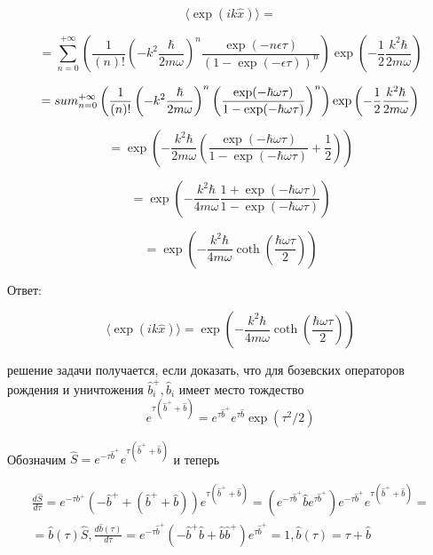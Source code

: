 \documentclass[a4paper,12pt]{article} %
\begin{document}
\begin{ttask}
$$
\langle\exp (i k \hat{x})\rangle=
$$


$$
=\sum_{n=0}^{+\infty}\left(\frac{1}{(n) !}\left(-k^{2} \frac{\hbar}{2 m \omega}\right)^{n} \frac{\exp (-n \epsilon \tau)}{(1-\exp (-\epsilon \tau))^{n}}\right) \exp \left(-\frac{1}{2} \frac{k^{2} \hbar}{2 m \omega}\right)
$$


$$
=
\\sum_{n=0}^{+\infty}\left(\frac{1}{(n) !}\left(-k^{2} \frac{\hbar}{2 m \omega}\right)^{n}\left(\frac{\exp (-\hbar \omega \tau)}{1-\exp (-\hbar \omega \tau)}\right)^{n}\right) \exp \left(-\frac{1}{2} \frac{k^{2} \hbar}{2 m \omega}\right)
$$


$$
=\exp \left(-\frac{k^{2} \hbar}{2 m \omega}\left(\frac{\exp (-\hbar \omega \tau)}{1-\exp (-\hbar \omega \tau)}+\frac{1}{2}\right)\right)
$$



$$
=\exp \left(-\frac{k^{2} \hbar}{4 m \omega} \frac{1+\exp (-\hbar \omega \tau)}{1-\exp (-\hbar \omega \tau)}\right)
$$



$$
=\exp \left(-\frac{k^{2} \hbar}{4 m \omega} \operatorname{coth}\left(\frac{\hbar \omega \tau}{2}\right)\right)
$$




Ответ:



$$
\langle\exp (i k \hat{x})\rangle=\exp \left(-\frac{k^{2} \hbar}{4 m \omega} \operatorname{coth}\left(\frac{\hbar \omega \tau}{2}\right)\right)
$$





решение задачи получается, если 
доказать, что для бозевских операторов рождения и уничтожения $\hat{b}_{i}^{+}, \hat{b}_{i}$ имеет место тождество
$$
e^{\tau\left(\hat{b}^{+}+\hat{b}\right)}=e^{\tau \hat{b}^{+}} e^{\tau \hat{b}} \exp \left(\tau^{2} / 2\right)
$$


Обозначим 
$ \hat{S}=e^{-\tau \hat{b}^{+}} e^{\tau\left(\hat{b}^{+}+\hat{b}\right)} $ 
и теперь

\[ \begin{array}{l}
	\frac{d \hat{S}}{d \tau}=e^{-\tau b^{+}}\left(-\hat{b}^{+}+\left(\hat{b}^{+}+\hat{b}\right)\right) e^{\tau\left(\hat{b}^{+}+\hat{b}\right)}=\left(e^{-\tau \hat{b}^{+}} \hat{b} e^{\tau \hat{b}^{+}}\right) e^{-\tau \hat{b}^{+}} e^{\tau\left(\hat{b}^{+}+\hat{b}\right)}= \\
	=\hat{b}(\tau) \hat{S}, \frac{d \hat{b}(\tau)}{d \tau}=e^{-\tau \hat{b}^{+}}\left(-\hat{b}^{+} \hat{b}+\hat{b} \hat{b}^{+}\right) e^{\tau \hat{b}^{+}}=1, \hat{b}(\tau)=\tau+\hat{b}
\end{array} \]



\end{ttask}
\end{document}
